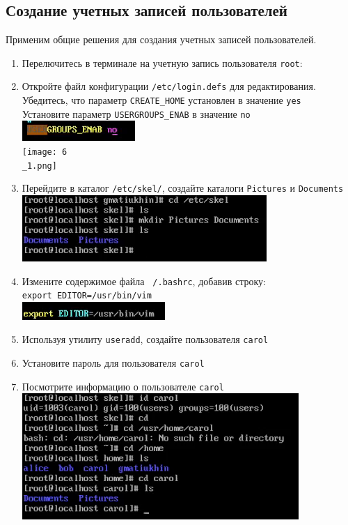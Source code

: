 \documentclass[12pt]{article}
\begin{document}
    \subsection{Создание учетных записей пользователей}
      Применим общие решения для создания учетных записей пользователей.
      \begin{enumerate}
        \item Перелючитесь в терминале на учетную запись пользователя \texttt{root}:
        \item Откройте файл конфигурации \texttt{/etc/login.defs} для редактирования.\\
          Убедитесь, что параметр \texttt{CREATE\_HOME} установлен в значение \texttt{yes}\\
          Установите параметр \texttt{USERGROUPS\_ENAB} в значение \texttt{no}
          \\\includegraphics{6.png}
          \\\texttt{[image: 6\\\_1.png]}
        \item Перейдите в каталог \texttt{/etc/skel/}, создайте каталоги \texttt{Pictures} и \texttt{Documents}
          \\\includegraphics{7.png}\\
        \item Измените содержимое файла \texttt{~/.bashrc}, добавив строку:\\
          \texttt{export EDITOR=/usr/bin/vim}
          \\\includegraphics{8.png}\\
        \item Используя утилиту \texttt{useradd}, создайте пользователя \texttt{carol}
        \item Установите пароль для пользователя \texttt{carol}
        \item Посмотрите информацию о пользователе \texttt{carol}
          \\\includegraphics{9.png}\\

\end{enumerate}
\end{document}
